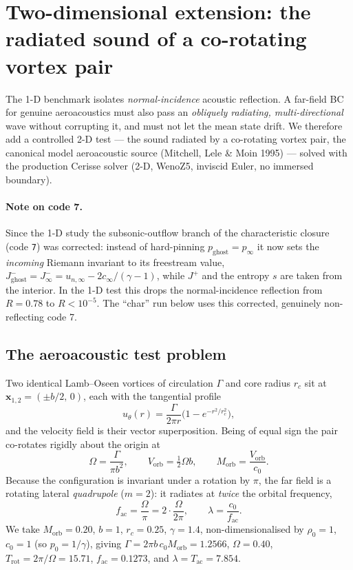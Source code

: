 \documentclass[11pt]{article}
\newcommand{\pinf}{p_\infty}
\begin{document}
\section{Two-dimensional extension: the radiated sound of a co-rotating vortex pair}
\label{sec:cvp}
The 1-D benchmark isolates \emph{normal-incidence} acoustic reflection. A
far-field BC for genuine aeroacoustics must also pass an \emph{obliquely
radiating, multi-directional} wave without corrupting it, and must not let the
mean state drift. We therefore add a controlled 2-D test --- the sound radiated
by a co-rotating vortex pair, the canonical model aeroacoustic source
(Mitchell, Lele \& Moin 1995) --- solved with the production Cerisse solver
(2-D, WenoZ5, inviscid Euler, no immersed boundary).

\paragraph{Note on code 7.} Since the 1-D study the subsonic-outflow branch of
the characteristic closure (code \texttt{7}) was corrected: instead of
hard-pinning $p_{\text{ghost}}=\pinf$ it now sets the \emph{incoming} Riemann
invariant to its freestream value,
$J^-_{\text{ghost}}=J^-_\infty=u_{n,\infty}-2c_\infty/(\gamma-1)$, while $J^+$
and the entropy $s$ are taken from the interior. In the 1-D test this drops the
normal-incidence reflection from $R=0.78$ to $R<10^{-5}$. The ``char'' run below
uses this corrected, genuinely non-reflecting code 7.

\subsection{The aeroacoustic test problem}
Two identical Lamb--Oseen vortices of circulation $\Gamma$ and core radius $r_c$
sit at $\bm x_{1,2}=(\pm b/2,\,0)$, each with the tangential profile
\begin{equation}
u_\theta(r)=\frac{\Gamma}{2\pi r}\Big(1-e^{-r^2/r_c^2}\Big),
\end{equation}
and the velocity field is their vector superposition. Being of equal sign the
pair co-rotates rigidly about the origin at
\begin{equation}
\Omega=\frac{\Gamma}{\pi b^2},\qquad
V_{\text{orb}}=\tfrac12\Omega b,\qquad
M_{\text{orb}}=\frac{V_{\text{orb}}}{c_0}.
\end{equation}
Because the configuration is invariant under a rotation by $\pi$, the far field
is a rotating lateral \emph{quadrupole} ($m=2$): it radiates at \emph{twice} the
orbital frequency,
\begin{equation}
f_{\text{ac}}=\frac{\Omega}{\pi}=2\cdot\frac{\Omega}{2\pi},
\qquad
\lambda=\frac{c_0}{f_{\text{ac}}}.
\end{equation}
We take $M_{\text{orb}}=0.20$, $b=1$, $r_c=0.25$, $\gamma=1.4$, non-dimensionalised
by $\rho_0=1$, $c_0=1$ (so $p_0=1/\gamma$), giving $\Gamma=2\pi b\,c_0
M_{\text{orb}}=1.2566$, $\Omega=0.40$, $T_{\text{rot}}=2\pi/\Omega=15.71$,
$f_{\text{ac}}=0.1273$, and $\lambda=T_{\text{ac}}=7.854$.
\end{document}
